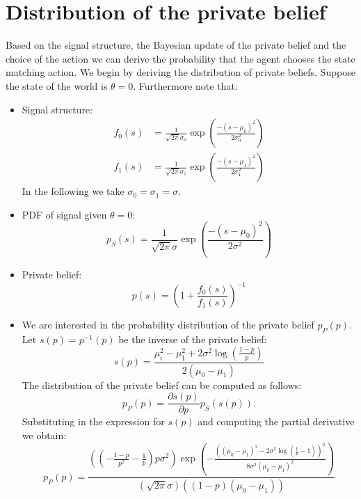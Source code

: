 \documentclass[10pt,a4paper]{article}
\begin{document}
\section{Distribution of the private belief}
Based on the signal structure, the Bayesian update of the private belief and the choice of the action we can derive the probability that the agent chooses the state matching action. We begin by deriving the distribution of private beliefs. Suppose the state of the world is $\theta  = 0$. Furthermore note that: 
\begin{itemize}
\item Signal structure:
\begin{equation}
\begin{aligned}
f_0(s) &= \frac{1}{\sqrt{2\pi}\sigma_0} \exp \left( \frac{-(s-\mu_0)^2}{2 \sigma_0^2} \right)\\
f_1(s) &= \frac{1}{\sqrt{2\pi}\sigma_1} \exp \left( \frac{-(s-\mu_1)^2}{2 \sigma_1^2} \right) 
\end{aligned}
\end{equation}
In the following we take $\sigma_0 = \sigma_1 = \sigma$.
\item PDF of signal given $\theta = 0$:
\begin{equation}
p_S(s) = \frac{1}{\sqrt{2\pi}\sigma} \exp \left( \frac{-(s-\mu_0)^2}{2 \sigma^2} \right)
\end{equation}
\item Private belief:
\begin{equation}
p(s) = \left( 1 + \frac{f_0(s)}{f_1(s)} \right)^{-1}
\end{equation}
\item We are interested in the probability distribution of the private belief $p_P(p)$. Let $s(p) = p^{-1}(p)$ be the inverse of the private belief:
\begin{equation}
s(p)=  \frac{\mu_i^2-\mu_1^2+2 \sigma^2 \log \left(\frac{1-p}{p}\right)}{2 (\mu_0-\mu_1)}
\end{equation}
The distribution of the private belief can be computed as follows:
\begin{equation}
p_P(p) = \frac{\partial s(p) }{\partial p } p_S(s(p)).
\end{equation}
Substituting in the expression for $s(p)$ and computing the partial derivative we obtain:
\begin{equation}
p_P(p) = \frac{\left(\left(-\frac{1-p}{p^2}-\frac{1}{p}\right) p \sigma^2\right) \exp \left(-\frac{\left((\mu_0-\mu_1)^2-2 \sigma^2 \log \left(\frac{1}{p}-1\right)\right)^2}{8 \sigma^2 (\mu_0-\mu_1)^2}\right)}{\left(\sqrt{2 \pi } \sigma\right) ((1-p) (\mu_0-\mu_1))}

\end{equation}
\end{itemize}
\end{document}
